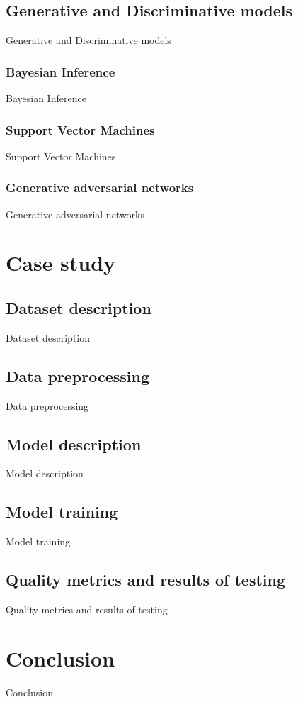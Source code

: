 \documentclass{article}
\theoremstyle{definition}
\begin{document}
\subsection{Generative and Discriminative models}
Generative and Discriminative models

\subsubsection{Bayesian Inference}
Bayesian Inference

\subsubsection{Support Vector Machines}
Support Vector Machines

\subsubsection{Generative adversarial networks}
Generative adversarial networks

\section{Case study}

\subsection{Dataset description}
Dataset description

\subsection{Data preprocessing}
Data preprocessing

\subsection{Model description}
Model description

\subsection{Model training}
Model training

\subsection{Quality metrics and results of testing}
Quality metrics and results of testing

\section{Conclusion}
Conclusion


\end{document}
